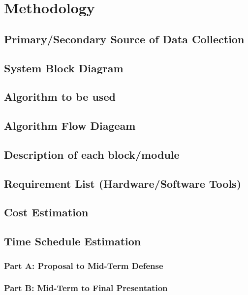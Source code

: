 \documentclass{article}
\begin{document}
\section{Methodology}
\cleardoublepage

\subsection{Primary/Secondary Source of Data Collection}
\cleardoublepage

\subsection{System Block Diagram}
\cleardoublepage

\subsection{Algorithm to be used}
\cleardoublepage

\subsection{Algorithm Flow Diageam}
\cleardoublepage

\subsection{Description of each block/module}
\cleardoublepage

\subsection{Requirement List (Hardware/Software Tools)}
\cleardoublepage

\subsection{Cost Estimation}
\cleardoublepage

\subsection{Time Schedule Estimation}
\cleardoublepage
\subsubsection{Part A: Proposal to Mid-Term Defense}
\cleardoublepage
\subsubsection{Part B: Mid-Term to Final Presentation}
\cleardoublepage
\end{document}

